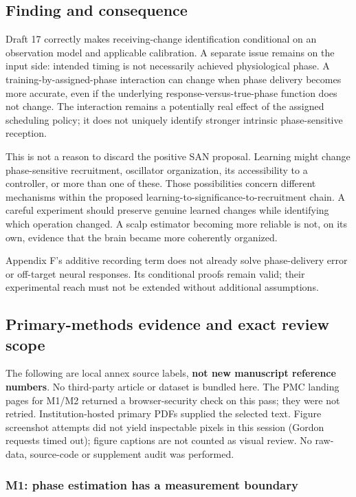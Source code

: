 \documentclass[
  american,
  11pt,
  letterpaper,
]{article}
\begin{document}
\subsection{Finding and consequence}\label{finding-and-consequence}

Draft 17 correctly makes receiving-change identification conditional on an observation model and applicable calibration. A separate issue remains on the input side: intended timing is not necessarily achieved physiological phase. A training-by-assigned-phase interaction can change when phase delivery becomes more accurate, even if the underlying response-versus-true-phase function does not change. The interaction remains a potentially real effect of the assigned scheduling policy; it does not uniquely identify stronger intrinsic phase-sensitive reception.

This is not a reason to discard the positive SAN proposal. Learning might change phase-sensitive recruitment, oscillator organization, its accessibility to a controller, or more than one of these. Those possibilities concern different mechanisms within the proposed learning-to-significance-to-recruitment chain. A careful experiment should preserve genuine learned changes while identifying which operation changed. A scalp estimator becoming more reliable is not, on its own, evidence that the brain became more coherently organized.

Appendix F's additive recording term does not already solve phase-delivery error or off-target neural responses. Its conditional proofs remain valid; their experimental reach must not be extended without additional assumptions.

\subsection{Primary-methods evidence and exact review scope}\label{primary-methods-evidence-and-exact-review-scope}

The following are local annex source labels, \textbf{not new manuscript reference numbers}. No third-party article or dataset is bundled here. The PMC landing pages for M1/M2 returned a browser-security check on this pass; they were not retried. Institution-hosted primary PDFs supplied the selected text. Figure screenshot attempts did not yield inspectable pixels in this session (Gordon requests timed out); figure captions are not counted as visual review. No raw-data, source-code or supplement audit was performed.

\subsubsection{M1: phase estimation has a measurement boundary}\label{m1-phase-estimation-has-a-measurement-boundary}
\end{document}
